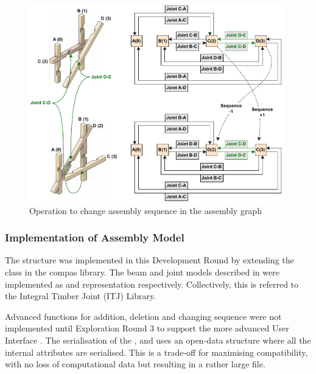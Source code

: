 \begin{figure}[!h]
    \centering
    \includegraphics[width=0.99\textwidth]{images/05/image89.pdf}
    \caption{Operation to change assembly sequence in the assembly graph}
    \label{fig:assembly-graph-change-sequence}
\end{figure}

\FloatBarrier

\subsubsection{Implementation of Assembly Model}
\label{subsubsection:exploration-2-assemblymodel-implementation}

The  structure was implemented in this Development Round by extending the  class in the compas library.
The beam and joint models described in  were implemented as  and  representation respectively. 
Collectively, this is referred to the Integral Timber Joint (ITJ) Library.

Advanced functions for addition, deletion and changing sequence were not implemented until Exploration Round 3 to support the more advanced User Interface .
The serialisation of the ,  and  uses an open-data structure where all the internal attributes are serialised. This is a trade-off for maximising compatibility, with no loss of computational data but resulting in a rather large file. 


